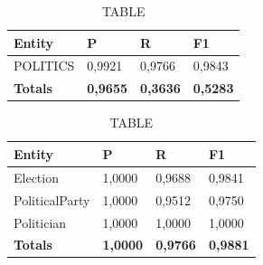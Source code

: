\documentclass[thesis=M,english]{FITthesis}[2018/05/30]
\begin{document}
	
	\begin{table}[H]\centering
		\caption{TABLE}
		\label{}
		\begin{tabular}{|l|l|l|l|}
			\hline {\textbf{Entity}} & {\textbf{P}} & {\textbf{R}} & {\textbf{F1}}\\\hline
				POLITICS & 0,9921 & 0,9766 & 0,9843\\\hline
				\textbf{Totals} & \textbf{0,9655} & \textbf{0,3636} & \textbf{0,5283}\\\hline
		\end{tabular}
	\end{table}	
	
	\begin{table}[H]\centering
		\caption{TABLE}
		\label{}
		\begin{tabular}{|l|l|l|l|}
			\hline {\textbf{Entity}} & {\textbf{P}} & {\textbf{R}} & {\textbf{F1}}\\\hline
				Election & 1,0000 & 0,9688 & 0,9841\\
				PoliticalParty & 1,0000 & 0,9512 & 0,9750\\
				Politician & 1,0000 & 1,0000 & 1,0000\\\hline
				\textbf{Totals} & \textbf{1,0000} & \textbf{0,9766} & \textbf{0,9881}\\\hline
		\end{tabular}
	\end{table}
	
	
\end{document}
